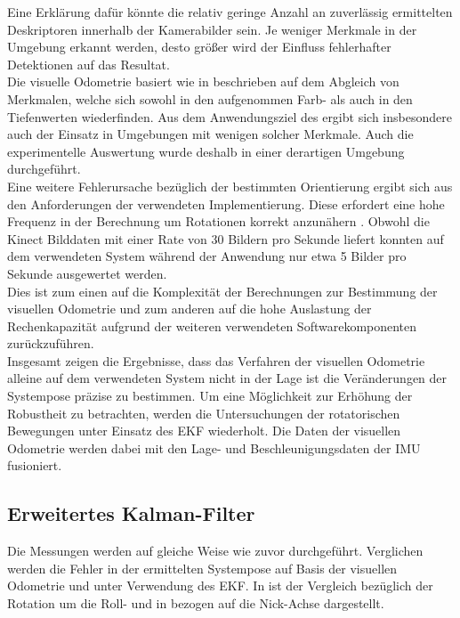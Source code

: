 Eine Erklärung dafür könnte die relativ geringe Anzahl an zuverlässig ermittelten Deskriptoren innerhalb der Kamerabilder sein. Je weniger Merkmale in der Umgebung erkannt werden, desto größer wird der Einfluss fehlerhafter Detektionen auf das Resultat.\\
Die visuelle Odometrie basiert wie in  beschrieben auf dem Abgleich von Merkmalen, welche sich sowohl in den aufgenommen Farb- als auch in den Tiefenwerten wiederfinden. Aus dem Anwendungsziel des  ergibt sich insbesondere auch der Einsatz in Umgebungen mit wenigen solcher Merkmale. Auch die experimentelle Auswertung wurde deshalb in einer derartigen Umgebung durchgeführt.\\

Eine weitere Fehlerursache bezüglich der bestimmten Orientierung ergibt sich aus den Anforderungen der verwendeten Implementierung. Diese erfordert eine hohe Frequenz in der Berechnung um Rotationen korrekt anzunähern \cite{Fovis}. Obwohl die Kinect Bilddaten mit einer Rate von \SI{30}{} Bildern pro Sekunde liefert konnten auf dem verwendeten System während der Anwendung nur etwa \SI{5}{} Bilder pro Sekunde ausgewertet werden.\\
Dies ist zum einen auf die Komplexität der Berechnungen zur Bestimmung der visuellen Odometrie und zum anderen auf die hohe Auslastung der Rechenkapazität aufgrund der weiteren verwendeten Softwarekomponenten zurückzuführen.\\ 

Insgesamt zeigen die Ergebnisse, dass das Verfahren der visuellen Odometrie alleine auf dem verwendeten System nicht in der Lage ist die Veränderungen der Systempose präzise zu bestimmen. Um eine Möglichkeit zur Erhöhung der Robustheit zu betrachten, werden die Untersuchungen der rotatorischen Bewegungen unter Einsatz des EKF wiederholt. Die Daten der visuellen Odometrie werden dabei mit den Lage- und Beschleunigungsdaten der IMU fusioniert.\\

\subsection{Erweitertes Kalman-Filter}
Die Messungen werden auf gleiche Weise wie zuvor durchgeführt. Verglichen werden die Fehler in der ermittelten Systempose auf Basis der visuellen Odometrie und unter Verwendung des EKF. In  ist der Vergleich bezüglich der Rotation um die Roll- und in  bezogen auf die Nick-Achse dargestellt.

